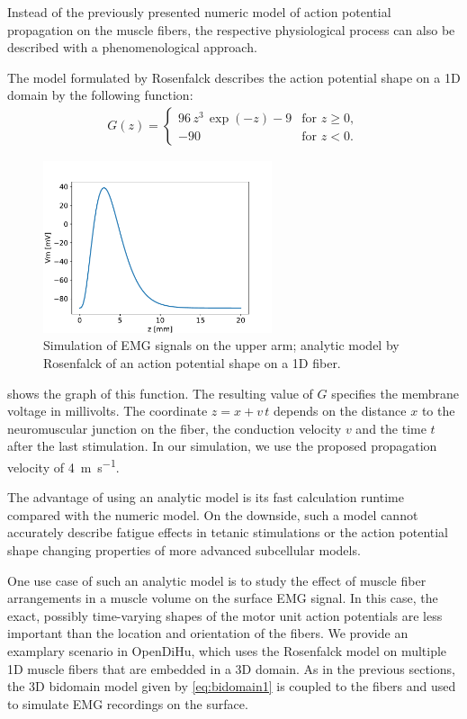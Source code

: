Instead of the previously presented numeric model of action potential propagation on the muscle fibers, the respective physiological process can also be described with a phenomenological approach.

The model formulated by Rosenfalck \cite{Rosenfalck1969} describes the action potential shape on a 1D domain by the following function:
%
\begin{align*}
  G(z) = \begin{cases}
    96\,z^3\,\exp(-z) - 9 & \text{for } z \geq 0,\\[4mm]
    -90  & \text{for } z < 0.
  \end{cases}  
\end{align*}

\begin{figure}
  \centering%
  \includegraphics[width=0.6\textwidth]{images/results/application/rosenfalck_function.pdf}%
  \caption{Simulation of EMG signals on the upper arm; analytic model by Rosenfalck of an action potential shape on a 1D fiber.}%
  \label{fig:rosenfalck_function}%
\end{figure}
 shows the graph of this function. The resulting value of $G$ specifies the membrane voltage in millivolts. The coordinate $z=x+v\,t$ depends on the distance $x$ to the neuromuscular junction on the fiber, the conduction velocity $v$ and the time $t$ after the last stimulation. In our simulation, we use the proposed propagation velocity of \SI{4}{\meter\per\second}.

The advantage of using an analytic model is its fast calculation runtime compared with the numeric model. On the downside, such a model cannot accurately describe fatigue effects in tetanic stimulations or the action potential shape changing properties of more advanced subcellular models.

One use case of such an analytic model is to study the effect of muscle fiber arrangements in a muscle volume on the surface EMG signal. In this case, the exact, possibly time-varying shapes of the motor unit action potentials are less important than the location and orientation of the fibers.
We provide an examplary scenario in OpenDiHu, which uses the Rosenfalck model on multiple 1D muscle fibers that are embedded in a 3D domain. As in the previous sections, the 3D bidomain model given by \cref{eq:bidomain1} is coupled to the fibers and used to simulate EMG recordings on the surface. 

